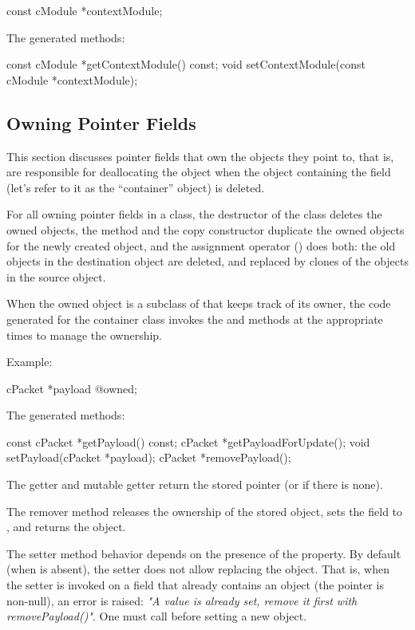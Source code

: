 \begin{msg}
const cModule *contextModule;
\end{msg}

The generated methods:

\begin{cpp}
const cModule *getContextModule() const;
void setContextModule(const cModule *contextModule);
\end{cpp}


\subsection{Owning Pointer Fields}
\label{sec:msg-defs:pointers-fields}

This section discusses pointer fields that own the objects they point to, that
is, are responsible for deallocating the object when the object containing the
field (let's refer to it as the ``container'' object) is deleted.

For all owning pointer fields in a class, the destructor of the class deletes the
owned objects, the  method and the copy constructor duplicate the
owned objects for the newly created object, and the assignment operator
() does both: the old objects in the destination object are
deleted, and replaced by clones of the objects in the source object.

When the owned object is a subclass of  that keeps track of
its owner, the code generated for the container class invokes the 
and  methods at the appropriate times to manage the ownership.

Example:

\begin{msg}
cPacket *payload @owned;
\end{msg}

The generated methods:

\begin{cpp}
const cPacket *getPayload() const;
cPacket *getPayloadForUpdate();
void setPayload(cPacket *payload);
cPacket *removePayload();
\end{cpp}

The getter and mutable getter return the stored pointer (or  if
there is none).

The remover method releases the ownership of the stored object, sets the field
to , and returns the object.

The setter method behavior depends on the presence of the 
property. By default (when  is absent), the setter does not
allow replacing the object. That is, when the setter is invoked on a field that
already contains an object (the pointer is non-null), an error is raised:
\textit{"A value is already set, remove it first with removePayload()"}.
One must call  before setting a new object.

